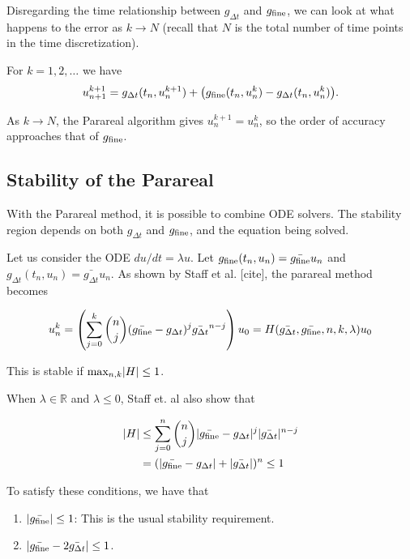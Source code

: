 \documentclass[letterpaper,12pt]{article}
\begin{document}
Disregarding the time relationship between $g_{\Delta t}$ and
$g_{\textnormal{fine}}$, we can look at what happens to the error as $k \to N$
(recall that $N$ is the total number of time points in the time discretization). 

For $k = 1, 2, \ldots$ we have 
\[u_{n+1}^{k+1} = g_{\Delta t} (t_n, u_n^{k+1}) + \big(
g_{\textnormal{fine}}(t_n, u_n^k) - g_{\Delta t}(t_n, u_n^k)\big). \]

As $k \to N$, the Parareal algorithm gives $u_{n}^{k+1} = u^k_n$, so the order
of accuracy approaches that of $g_{\textnormal{fine}}$. 


\subsection{Stability of the Parareal}

With the Parareal method, it is possible to combine ODE solvers. The stability region depends on both $g_{\Delta t}$ and $g_{\textnormal{fine}}$, and the
equation being solved. 

Let us consider the ODE $du/dt = \lambda u$. Let $g_{\textnormal{fine}}(t_n,
u_n) = \bar{g_{\textnormal{fine}}}u_n$ and $g_{\Delta t}(t_n, u_n) =
\bar{g_{\Delta t}} u_n$. As shown by Staff et al. [cite], the parareal method
becomes 

\[ u_n^k = \left( \sum_{j=0}^k {n \choose j} (\bar{g_{\textnormal{fine}}} -
g_{\Delta t})^j \bar{g_{\Delta t}}^{n-j} \right) u_0 = H(\bar{g_{\Delta
t}}, \bar{g_{\textnormal{fine}}}, n, k, \lambda)u_0 \]

This is stable if $\textnormal{max}_{n, k} |H| \leq 1$. 

When $\lambda \in \mathbb{R}$ and $\lambda \leq 0$, Staff et. al also show that

\[
    \begin{aligned}
    |H| &\leq \sum_{j=0}^n {n \choose j} |\bar{g_{\textnormal{fine}}} -
    g_{\Delta t}|^j |\bar{g_{\Delta t}}|^{n-j} \\
    &= (|\bar{g_{\textnormal{fine}}} - g_{\Delta t}| + |\bar{g_{\Delta
    t}}|)^n \leq 1
    \end{aligned}
\]

To satisfy these conditions, we have that 
\begin{enumerate}
    \item $| \bar{g_{\textnormal{fine}}} | \leq 1$: This is the usual stability
        requirement.
    \item $|\bar{g_{\textnormal{fine}}} - 2 \bar{g_{\Delta t}}| \leq 1$.
\end{enumerate}
\end{document}
